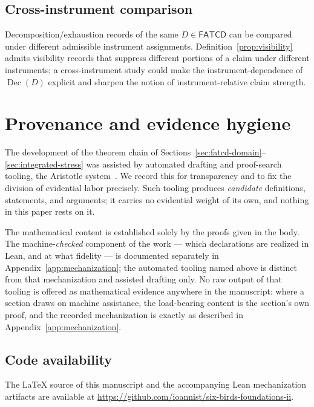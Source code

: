 \documentclass[11pt]{article}
\theoremstyle{definition}
\newcommand{\FATCD}{\ensuremath{\mathsf{FATCD}}}
\newcommand{\Dec}[1]{\ensuremath{\operatorname{Dec}\!\left(#1\right)}}
\begin{document}
\subsection{Cross-instrument comparison}\label{subsec:future-cross-instrument}

Decomposition/exhaustion records of the same \(D \in \FATCD{}\) can
be compared under different admissible instrument assignments.
Definition~\ref{prop:visibility} admits visibility records that
suppress different portions of a claim under different instruments; a
cross-instrument study could make the instrument-dependence of
\(\Dec{D}\) explicit and sharpen the notion of instrument-relative
claim strength.
 
\appendix
\section{Provenance and evidence hygiene}\label{app:provenance}


The development of the theorem chain of
Sections~\ref{sec:fatcd-domain}--\ref{sec:integrated-stress} was assisted by
automated drafting and proof-search tooling, the Aristotle
system~\citep{Achim2025Aristotle}. We record this for transparency and to fix the
division of evidential labor precisely. Such tooling produces \emph{candidate}
definitions, statements, and arguments; it carries no evidential weight of its
own, and nothing in this paper rests on it.

The mathematical content is established solely by the proofs given in the body.
The machine-\emph{checked} component of the work --- which declarations are
realized in Lean, and at what fidelity --- is documented separately in
Appendix~\ref{app:mechanization}; the automated tooling named above is distinct
from that mechanization and assisted drafting only. No raw output of that tooling
is offered as mathematical evidence anywhere in the manuscript: where a section
draws on machine assistance, the load-bearing content is the section's own proof,
and the recorded mechanization is exactly as described in
Appendix~\ref{app:mechanization}.

\subsection{Code availability}\label{app:code-availability}

The \LaTeX{} source of this manuscript and the accompanying Lean mechanization
artifacts are available at
\url{https://github.com/ioannist/six-birds-foundations-ii}.
\end{document}
